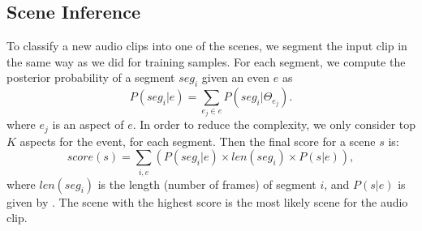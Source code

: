 \subsection{Scene Inference}
%
%
To classify a new audio clips into one of the scenes, 
we segment the input clip in the same way as we did for training samples. 
For each segment, we compute the posterior probability of a segment
$seg_i$ given an even $e$ as
\begin{equation}
P(seg_i | e) = \sum_{e_j \in e} P(seg_i | \Theta_{e_j}).
\end{equation}
where $e_j$ is an aspect of $e$.  In order to reduce the complexity, 
we only consider top $K$ aspects for the event, for each segment. 
%
Then the final score for a scene $s$ is: 
\begin{equation}
\label{eqn:sc}
score(s) = \sum_{i,e} (P(seg_i | e) \times len(seg_i) \times P(s | e)),
\end{equation}
where $len(seg_i)$ is the length (number of frames) of segment $i$, 
and $P(s | e)$ is given by .
The scene with the highest score is the most likely scene for the audio
clip.

